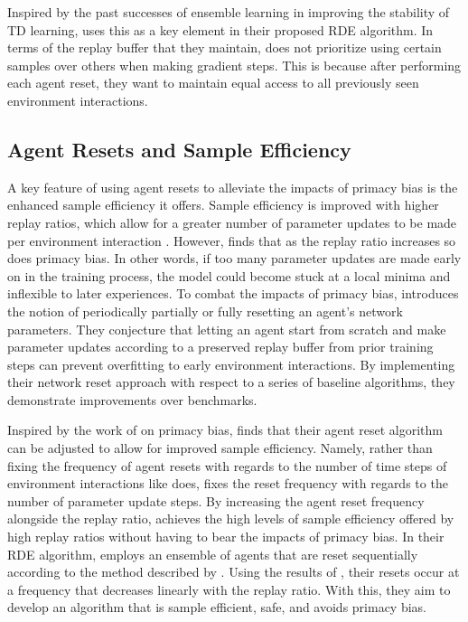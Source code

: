 \documentclass[base]{subfiles}
\begin{document}
Inspired by the past successes of ensemble learning in improving the stability of TD learning, \cite{kim2023} uses this as a key element in their proposed RDE algorithm.
In terms of the replay buffer that they maintain, \cite{kim2023} does not prioritize using certain samples over others when making gradient steps.
This is because after performing each agent reset, they want to maintain equal access to all previously seen environment interactions.

\subsection{Agent Resets and Sample Efficiency}

A key feature of using agent resets to alleviate the impacts of primacy bias is the enhanced sample efficiency it offers.
Sample efficiency is improved with higher replay ratios, which allow for a greater number of parameter updates to be made per environment interaction \cite{fedus2020, hasselt2019}.
However, \cite{nikishin2022} finds that as the replay ratio increases so does primacy bias.
In other words, if too many parameter updates are made early on in the training process, the model could become stuck at a local minima and inflexible to later experiences.
To combat the impacts of primacy bias, \cite{nikishin2022} introduces the notion of periodically partially or fully resetting an agent's network parameters.
They conjecture that letting an agent start from scratch and make parameter updates according to a preserved replay buffer from prior training steps can prevent overfitting to early environment interactions.
By implementing their network reset approach with respect to a series of baseline algorithms, they demonstrate improvements over benchmarks.

Inspired by the work of \cite{nikishin2022} on primacy bias, \cite{doro2023} finds that their agent reset algorithm can be adjusted to allow for improved sample efficiency.
Namely, rather than fixing the frequency of agent resets with regards to the number of time steps of environment interactions like \cite{nikishin2022} does, \cite{doro2023} fixes the reset frequency with regards to the number of parameter update steps.
By increasing the agent reset frequency alongside the replay ratio, \cite{doro2023} achieves the high levels of sample efficiency offered by high replay ratios without having to bear the impacts of primacy bias.
In their RDE algorithm, \cite{kim2023} employs an ensemble of agents that are reset sequentially according to the method described by \cite{nikishin2022}.
Using the results of \cite{doro2023}, their resets occur at a frequency that decreases linearly with the replay ratio.
With this, they aim to develop an algorithm that is sample efficient, safe, and avoids primacy bias.
\end{document}
